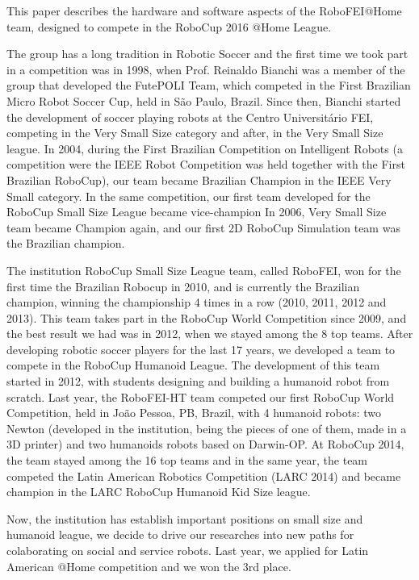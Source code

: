 This paper describes the hardware and software aspects of the RoboFEI@Home team, designed to compete in the RoboCup 2016 @Home League.

The group has a long tradition in Robotic Soccer and the first time we took part in a competition was in 1998, when Prof. Reinaldo Bianchi was a member of the group that developed the FutePOLI Team, which competed in the First Brazilian Micro Robot Soccer Cup, held in São Paulo, Brazil. Since then, Bianchi started the development of soccer playing robots at the Centro Universitário FEI, competing in the Very Small Size category and after, in the Very Small Size league. In 2004, during the First Brazilian Competition on Intelligent Robots (a competition were the IEEE Robot Competition was held together with the First Brazilian RoboCup), our team became Brazilian Champion in the IEEE Very Small category. In the same competition, our first team developed for the RoboCup Small Size League became vice-champion In 2006, Very Small Size team became Champion again, and our first 2D RoboCup Simulation team was the Brazilian champion.

The institution RoboCup Small Size League team, called RoboFEI, won for the first time the Brazilian Robocup in 2010, and is currently the Brazilian champion, winning the championship 4 times in a row (2010, 2011, 2012 and 2013). This team takes part in the RoboCup World Competition since 2009, and the best result we had was in 2012, when we stayed among the 8 top teams. After developing robotic soccer players for the last 17 years, we developed a team to compete in the RoboCup Humanoid League. The development of this team started in 2012, with students designing and building a humanoid robot from scratch. Last year, the RoboFEI-HT team competed our first RoboCup World Competition, held in João Pessoa, PB, Brazil, with 4 humanoid robots: two Newton (developed in the institution, being the pieces of one of them, made in a 3D printer) and two humanoids robots based on Darwin-OP. At RoboCup 2014, the team stayed among the 16 top teams and in the same year, the team competed the Latin American Robotics Competition (LARC 2014) and became champion in the LARC RoboCup Humanoid Kid Size league.

Now, the institution has establish important positions on small size and humanoid league, we decide to drive our researches into new paths for colaborating on social and service robots. Last year, we applied for Latin American @Home competition and we won the 3rd place.